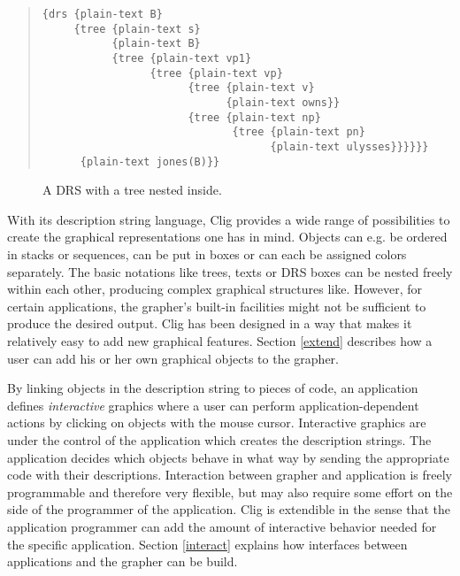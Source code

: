 \begin{quote}
\begin{verbatim}
{drs {plain-text B}
     {tree {plain-text s} 
           {plain-text B} 
           {tree {plain-text vp1} 
                 {tree {plain-text vp} 
                       {tree {plain-text v} 
                             {plain-text owns}} 
                       {tree {plain-text np} 
                              {tree {plain-text pn} 
                                    {plain-text ulysses}}}}}} 
      {plain-text jones(B)}}
\end{verbatim}
\end{quote}

\begin{figure}[ht]
\begin{center}
\leavevmode
{}
\caption{A DRS with a tree nested inside.}
\label{ex-1}
\end{center}
\end{figure}

With its description string language, {\sc Clig} provides a wide range
of possibilities to create the graphical representations one has in
mind. Objects can e.g. be ordered in stacks or sequences, can be put
in boxes or can each be assigned colors separately. The basic
notations like trees, texts or DRS boxes can be nested freely within
each other, producing complex graphical structures like. However, for
certain applications, the grapher's built-in facilities might not be
sufficient to produce the desired output. {\sc Clig} has been
designed in a way that makes it relatively easy to add new graphical
features. Section \ref{extend} describes how a user can add his or her
own graphical objects to the grapher.

By linking objects in the description string to pieces of code, an
application defines {\it interactive\/} graphics where a user can
perform application-dependent actions by clicking on objects with the
mouse cursor. Interactive graphics are under the control of the
application which creates the description strings. The application
decides which objects behave in what way by sending the appropriate
code with their descriptions. Interaction between grapher and
application is freely programmable and therefore very flexible, but
may also require some effort on the side of the programmer of the
application. {\sc Clig} is extendible in the sense that the application
programmer can add the amount of interactive behavior needed for the
specific application. Section \ref{interact} explains how interfaces
between applications and the grapher can be build.

